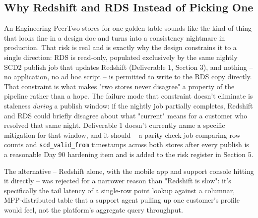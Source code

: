\documentclass[11pt]{article}
\begin{document}
\subsection{Why Redshift and RDS Instead of Picking One}
\begin{stakeholderq}{An Engineering Peer}{Two stores for one golden table sounds like the kind of thing that looks fine in a design doc and turns into a consistency nightmare in production.}
That risk is real and is exactly why the design constrains it to a single direction: RDS is read-only, populated exclusively by the same nightly SCD2 publish job that updates Redshift (Deliverable 1, Section 3), and nothing -- no application, no ad hoc script -- is permitted to write to the RDS copy directly. That constraint is what makes "two stores never disagree" a property of the pipeline rather than a hope. The failure mode that constraint doesn't eliminate is staleness \emph{during} a publish window: if the nightly job partially completes, Redshift and RDS could briefly disagree about what "current" means for a customer who resolved that same night. Deliverable 1 doesn't currently name a specific mitigation for that window, and it should -- a parity-check job comparing row counts and \texttt{scd\_valid\_from} timestamps across both stores after every publish is a reasonable Day 90 hardening item and is added to the risk register in Section 5.

The alternative -- Redshift alone, with the mobile app and support console hitting it directly -- was rejected for a narrower reason than "Redshift is slow": it's specifically the tail latency of a single-row point lookup against a columnar, MPP-distributed table that a support agent pulling up one customer's profile would feel, not the platform's aggregate query throughput.
\end{stakeholderq}
\end{document}
